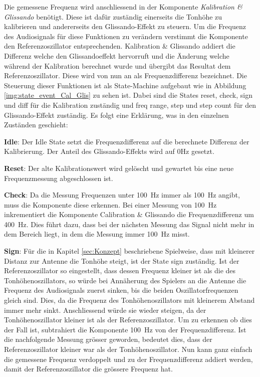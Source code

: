 Die gemessene Frequenz wird anschliessend in der Komponente \textit{Kalibration \& Glissando} benötigt. Diese ist dafür zuständig einerseits die Tonhöhe zu kalibrieren und andererseits den Glissando-Effekt zu steuern. Um die Frequenz des Audiosignals für diese Funktionen zu verändern verstimmt die Komponente den Referenzoszillator entsprechenden. Kalibration \& Glissando addiert die Differenz welche den Glissandoeffekt hervorruft und die Änderung welche während der Kalibration berechnet wurde und übergibt das Resultat dem Referenzoszillator. Diese wird von nun an als Frequenzdifferenz bezeichnet. Die Steuerung dieser Funktionen ist als State-Machine aufgebaut wie in Abbildung \ref{img:state_event_Cal_Glis} zu sehen ist. 
Dabei sind die States reset, check, sign und diff für die Kalibration zuständig und freq range, step und step count für den Glissando-Effekt zuständig. Es folgt eine Erklärung, was in den einzelnen Zuständen geschieht:

\textbf{Idle}:
Der Idle State setzt die Frequenzdifferenz auf die berechnete Differenz der Kalibrierung. Der Anteil des Glissando-Effekts wird auf 0Hz gesetzt.

\textbf{Reset}:
Der alte Kalibrationswert wird gelöscht und gewartet bis eine neue Frequenzmessung abgeschlossen ist.

\textbf{Check}:
Da die Messung Frequenzen unter \SI{100}{Hz} immer als \SI{100}{Hz} angibt, muss die Komponente diese erkennen. Bei einer Messung von \SI{100}{Hz} inkrementiert die Komponente Calibration \& Glissando die Frequenzdifferenz um \SI{400}{Hz}. Dies führt dazu, dass bei der nächsten Messung das Signal nicht mehr in dem Bereich liegt, in dem die Messung immer \SI{100}{Hz} misst.

\textbf{Sign}:
Für die in Kapitel \ref{sec:Konzept} beschriebene Spielweise, dass mit kleinerer Distanz zur Antenne die Tonhöhe steigt, ist der State sign zuständig. Ist der Referenzoszillator so eingestellt, dass dessen Frequenz kleiner ist als die des Tonhöhenoszillators, so würde bei Annäherung des Spielers an die Antenne die Frequenz des Audiosignals zuerst sinken, bis die beiden Oszillatorfrequenzen gleich sind. Dies, da die Frequenz des Tonhöhenoszillators mit kleinerem Abstand immer mehr sinkt. Anschliessend würde sie wieder steigen, da der Tonhöhenoszillator kleiner ist als der Referenzoszillator. Um zu erkennen ob dies der Fall ist, subtrahiert die Komponente \SI{100}{Hz} von der Frequenzdifferenz. Ist die nachfolgende Messung grösser geworden, bedeutet dies, dass der Referenzoszillator kleiner war als der Tonhöhenoszillator. Nun kann ganz einfach die gemessene Frequenz verdoppelt und zu der Frequenzdifferenz addiert werden, damit der Referenzoszillator die grössere Frequenz hat.

